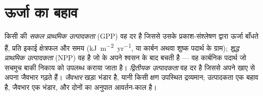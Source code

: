 \section{ऊर्जा का बहाव}

\begin{definition}[उत्पादकता]\label{def:b1:ecosystem-organization:productivity}
किसी  की \emph{सकल प्राथमिक उत्पादकता} (GPP) वह दर है जिससे
उसके  प्रकाश-संश्लेषण द्वारा ऊर्जा बाँधते हैं, प्रति इकाई
क्षेत्रफल और समय (\unit{kJ.m^{-2}.yr^{-1}}, या कार्बन अथवा शुष्क पदार्थ
के ग्राम); \emph{शुद्ध प्राथमिक उत्पादकता} (NPP) वह है जो  के
अपने श्वसन के बाद बचती है --- वह कार्बनिक पदार्थ जो सचमुच बाकी निकाय को
उपलब्ध कराया जाता है। \emph{द्वितीयक उत्पादकता} वह दर है जिससे 
अपने खाए से अपना जैवभार गढ़ते हैं। \emph{जैवभार} खड़ा भंडार है, यानी
किसी क्षण उपस्थित द्रव्यमान; उत्पादकता एक बहाव है, जैवभार एक भंडार, और
दोनों का अनुपात आवर्तन-काल है।
\end{definition}


